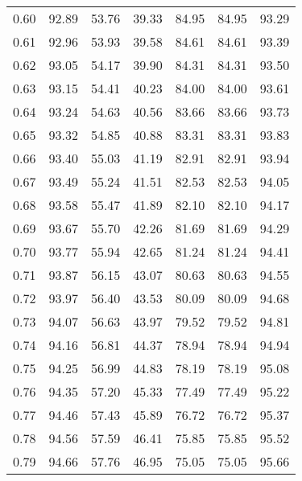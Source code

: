 \begin{tabular}{|c|c|c|c|c|c|c|}
      0.60 &     92.89 &     53.76 &      39.33 &   84.95 &      84.95 &         93.29 \\
      0.61 &     92.96 &     53.93 &      39.58 &   84.61 &      84.61 &         93.39 \\
      0.62 &     93.05 &     54.17 &      39.90 &   84.31 &      84.31 &         93.50 \\
      0.63 &     93.15 &     54.41 &      40.23 &   84.00 &      84.00 &         93.61 \\
      0.64 &     93.24 &     54.63 &      40.56 &   83.66 &      83.66 &         93.73 \\
      0.65 &     93.32 &     54.85 &      40.88 &   83.31 &      83.31 &         93.83 \\
      0.66 &     93.40 &     55.03 &      41.19 &   82.91 &      82.91 &         93.94 \\
      0.67 &     93.49 &     55.24 &      41.51 &   82.53 &      82.53 &         94.05 \\
      0.68 &     93.58 &     55.47 &      41.89 &   82.10 &      82.10 &         94.17 \\
      0.69 &     93.67 &     55.70 &      42.26 &   81.69 &      81.69 &         94.29 \\
      0.70 &     93.77 &     55.94 &      42.65 &   81.24 &      81.24 &         94.41 \\
      0.71 &     93.87 &     56.15 &      43.07 &   80.63 &      80.63 &         94.55 \\
      0.72 &     93.97 &     56.40 &      43.53 &   80.09 &      80.09 &         94.68 \\
      0.73 &     94.07 &     56.63 &      43.97 &   79.52 &      79.52 &         94.81 \\
      0.74 &     94.16 &     56.81 &      44.37 &   78.94 &      78.94 &         94.94 \\
      0.75 &     94.25 &     56.99 &      44.83 &   78.19 &      78.19 &         95.08 \\
      0.76 &     94.35 &     57.20 &      45.33 &   77.49 &      77.49 &         95.22 \\
      0.77 &     94.46 &     57.43 &      45.89 &   76.72 &      76.72 &         95.37 \\
      0.78 &     94.56 &     57.59 &      46.41 &   75.85 &      75.85 &         95.52 \\
      0.79 &     94.66 &     57.76 &      46.95 &   75.05 &      75.05 &         95.66 \\

\end{tabular}
